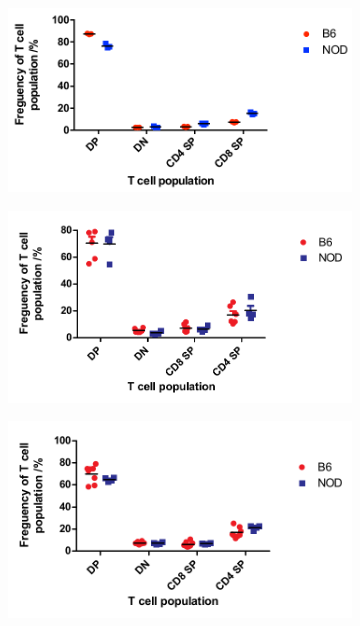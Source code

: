 \begin{figure}
	\begin{subfigure}{0.5\textwidth}
	\caption{}
	\includegraphics[width=\textwidth]{Figures/4wkNODB6Tcells.pdf}
	\label{subfig:4wkThyTcells}
	\end{subfigure}
	\begin{subfigure}{0.5\textwidth}
	\caption{}
 	\includegraphics[width=\textwidth]{Figures/9wkThyTcells.pdf}
	\label{subfig:9wkThyTcells}
	\end{subfigure}
	\begin{subfigure}{0.5\textwidth}
	\centering
	\caption{}
 	\includegraphics[width=\textwidth]{Figures/12wkThyTcells.pdf}

\end{subfigure}
\end{figure}
